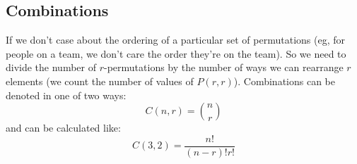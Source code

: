 \subsection{Combinations}\label{sub:combinations}

If we don't case about the ordering of a particular set of permutations (eg, for people on a team, we don't care the order they're on the team).
So we need to divide the number of \(r\)-permutations by the number of ways we can rearrange \(r\) elements (we count the number of values of \(P(r,r)\)).
Combinations can be denoted in one of two ways:
\[
    C(n, r) = {n\choose r}
\]
and can be calculated like:
\[
    C(3,2) = \frac{n!}{(n-r)!r!}
\]
